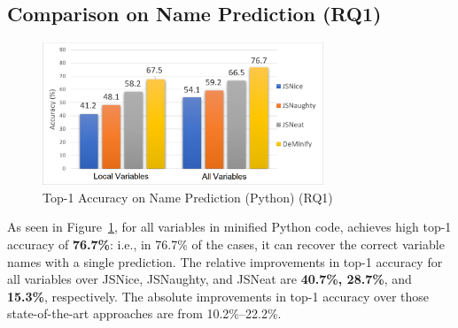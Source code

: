 \subsection{{\bf Comparison on Name Prediction (RQ1)}}
\label{empirical-rq1}


\begin{figure}[t] %
\begin{center}
\includegraphics[width=3.3in]{figures/name-prediction-result-3} %
\vspace{-8pt}
\caption{Top-1 Accuracy on Name Prediction (Python) (RQ1)}
\label{name-prediction-result}
\end{center}
\end{figure}





As seen in Figure~\ref{name-prediction-result}, for all variables in
minified Python code, {\tool} achieves high top-1 accuracy of {\bf 76.7\%}:
i.e., in 76.7\% of the cases, it can recover the correct variable names
with a single prediction. The relative improvements in top-1 accuracy
for all variables over JSNice, JSNaughty, and JSNeat are {\bf 40.7\%,
  28.7\%}, and {\bf 15.3\%}, respectively. The absolute improvements
in top-1 accuracy over those state-of-the-art approaches are from
10.2\%--22.2\%.

